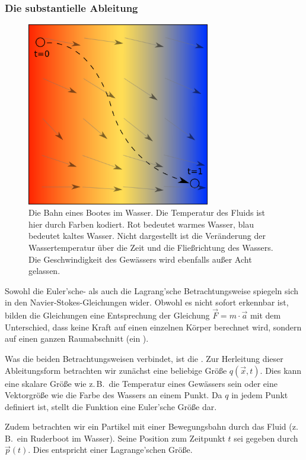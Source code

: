\subsubsection{Die substantielle Ableitung}

\begin{figure}[ht]
\centering
\includegraphics[width=8cm]{images/swimmer_in_water}
\caption{Die Bahn eines Bootes im Wasser. Die Temperatur des Fluids ist hier durch Farben kodiert. Rot bedeutet warmes Wasser, blau bedeutet kaltes Wasser. Nicht dargestellt ist die Veränderung der Wassertemperatur über die Zeit und die Fließrichtung des Wassers. Die Geschwindigkeit des Gewässers wird ebenfalls außer Acht gelassen.}
\end{figure}

Sowohl die Euler'sche- als auch die Lagrang'sche Betrachtungsweise spiegeln sich
in den Navier-Stokes-Gleichungen wider. Obwohl es nicht sofort
erkennbar ist, bilden die Gleichungen eine Entsprechung der Gleichung
$\vec{F} = m \cdot \vec{a}$ mit dem Unterschied, dass keine Kraft auf
einen einzelnen Körper berechnet wird, sondern auf einen ganzen
Raumabschnitt (ein ).

Was die beiden Betrachtungsweisen verbindet, ist die
. Zur Herleitung dieser
Ableitungsform betrachten wir zunächst eine beliebige Größe
$q(\vec{x},t)$. Dies kann eine skalare Größe wie z.\,B.\ die Temperatur
eines Gewässers sein oder eine Vektorgröße wie die Farbe des Wassers
an einem Punkt. Da $q$ in jedem Punkt definiert ist, stellt die
Funktion eine Euler'sche Größe dar.

Zudem betrachten wir ein Partikel mit einer Bewegungsbahn durch das
Fluid (z.\,B.\  ein Ruderboot im Wasser). Seine Position zum Zeitpunkt
$t$ sei gegeben durch $\vec{p}(t)$. Dies entspricht einer
Lagrange'schen Größe.

